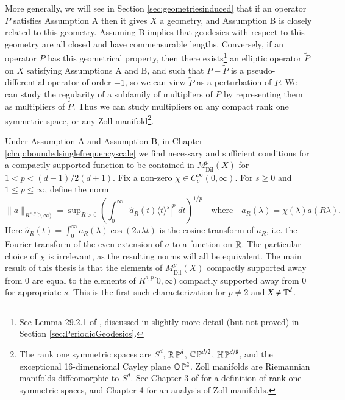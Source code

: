 More generally, we will see in Section \ref{sec:geometriesinduced} that if an operator $P$ satisfies Assumption A then it gives $X$ a geometry, and Assumption B is closely related to this geometry. Assuming B implies that geodesics with respect to this geometry are all closed and have commensurable lengths. Conversely, if an operator $P$ has this geometrical property, then there exists\footnote{See Lemma 29.2.1 of \cite{Hormander4}, discussed in slightly more detail (but not proved) in Section \ref{sec:PeriodicGeodesics}.} an elliptic operator $\tilde{P}$ on $X$ satisfying Assumptions A and B, and such that $P - \tilde{P}$ is a pseudo-differential operator of order $-1$, so we can view $\tilde{P}$ as a perturbation of $P$. We can study the regularity of a subfamily of multipliers of $P$ by representing them as multipliers of $\tilde{P}$. Thus we can study multipliers on any compact rank one symmetric space, or any Zoll manifold\footnote{The rank one symmetric spaces are $S^d$, $\operatorname{\mathbb{R}} \operatorname{\mathbb{P}}^d$, $\operatorname{\mathbb{C}} \operatorname{\mathbb{P}}^{d/2}$, $\mathbb{H} \operatorname{\mathbb{P}}^{d/8}$, and the exceptional 16-dimensional Cayley plane $\mathbb{O} \operatorname{\mathbb{P}}^2$. Zoll manifolds are Riemannian manifolds diffeomorphic to $S^d$. See Chapter 3 of \cite{Besse} for a definition of rank one symmetric spaces, and Chapter 4 for an analysis of Zoll manifolds.}.

Under Assumption A and Assumption B, in Chapter \ref{chap:boundedsinglefrequencyscale} we find necessary and sufficient conditions for a compactly supported function to be contained in $M^p_{\text{Dil}}(X)$ for $1 < p < (d-1)/2(d+1)$. Fix a non-zero $\chi \in C_c^\infty(0,\infty)$. For $s \geq 0$ and $1 \leq p \leq \infty$, define the norm
%
\begin{equation}
  \| a \|_{R^{s,p}[0,\infty)} = \sup\nolimits_{R > 0} \left( \int_0^\infty \left|\;\! \widehat{a}_R(t) \langle t \rangle^s \right|^p\; dt \right)^{1/p} \quad\text{where}\quad a_R(\lambda) = \chi(\lambda) a(R \lambda).
\end{equation}
%
Here $\widehat{a}_R(t) = \int_0^\infty a_R(\lambda) \cos(2 \pi \lambda t)$ is the cosine transform of $a_R$, i.e. the Fourier transform of the even extension of $a$ to a function on $\operatorname{\mathbb{R}}$. The particular choice of $\chi$ is irrelevant, as the resulting norms will all be equivalent. The main result of this thesis is that the elements of $M^p_{\text{Dil}}(X)$ compactly supported away from $0$ are equal to the elements of $R^{s,p}[0,\infty)$ compactly supported away from $0$ for appropriate $s$. This is the first such characterization for $p \neq 2$ and $X \neq \operatorname{\mathbb{T}}^d$.

